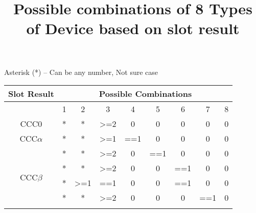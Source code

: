 \documentclass[fleqn]{article}
\begin{document}
\title{Possible combinations of 8 Types of Device based on slot result}

\maketitle{}

Asterisk (*) – Can be any number, Not sure case 

\begin {table} [h]
\centering
\begin{tabular}{|c|c|c|c|c|c|c|c|c|}
\hline
Slot Result                  & \multicolumn{8}{c|}{Possible Combinations}                                                                                                                                               \\ \hline
                             & 1                               & 2                               & 3                & 4   & 5                                & 6                               & 7                & 8   \\ \hline
CCC$0$                       & *                               & *                               & \textgreater{}=2 & 0   & 0                                & 0                               & 0                & 0   \\ \hline
CCC$\alpha$                  & *                               & *                               & \textgreater{}=1 & ==1 & 0                                & 0                               & 0                & 0   \\ \hline
\multirow{6}{*}{CCC$\beta$}  & *                               & *                               & \textgreater{}=2 & 0   & ==1                              & 0                               & 0                & 0   \\ \cline{2-9} 
                             & *                               & *                               & \textgreater{}=2 & 0   & 0                                & ==1                             & 0                & 0   \\ \cline{2-9} 
                             & *                               & \textgreater{}=1                & ==1              & 0   & 0                                & ==1                             & 0                & 0   \\ \cline{2-9} 
                             & *                               & *                               & \textgreater{}=2 & 0   & 0                                & 0                               & ==1              & 0   \\ \cline{2-9} 

\end{tabular}
\end{table}
\end{document}
